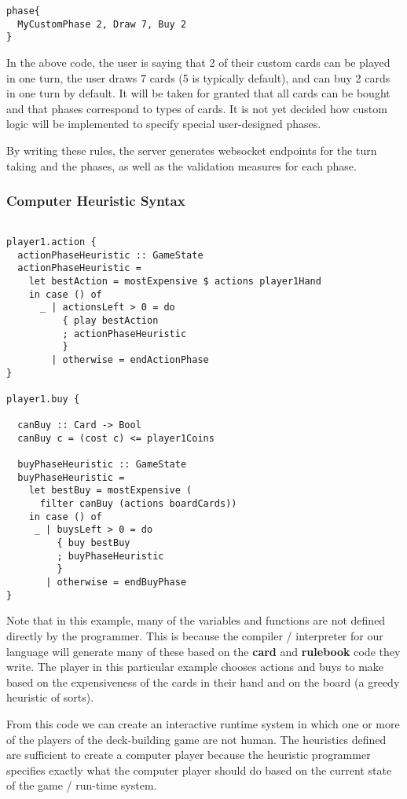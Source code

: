 \documentclass{acm_proc_article-sp}
\begin{document}
\begin{verbatim}
phase{
  MyCustomPhase 2, Draw 7, Buy 2
}
\end{verbatim}
In the above code, the user is saying that 2 of their custom cards can be played in one turn, the user draws 7 cards (5 is typically default), and can buy 2 cards in one turn by default. It will be taken for granted that all cards can be bought and that phases correspond to types of cards. It is not yet decided how custom logic will be implemented to specify special user-designed phases.

By writing these rules, the server generates websocket endpoints for the turn taking and the phases, as well as the validation measures for each phase.

\subsubsection{Computer Heuristic Syntax}
\begin{verbatim}

player1.action {
  actionPhaseHeuristic :: GameState
  actionPhaseHeuristic =
    let bestAction = mostExpensive $ actions player1Hand
    in case () of
      _ | actionsLeft > 0 = do
          { play bestAction
          ; actionPhaseHeuristic
          }
        | otherwise = endActionPhase
}

player1.buy {

  canBuy :: Card -> Bool
  canBuy c = (cost c) <= player1Coins

  buyPhaseHeuristic :: GameState
  buyPhaseHeuristic =
    let bestBuy = mostExpensive (
      filter canBuy (actions boardCards))
    in case () of
     _ | buysLeft > 0 = do
         { buy bestBuy
         ; buyPhaseHeuristic
         }
       | otherwise = endBuyPhase
}

\end{verbatim}

Note that in this example, many of the variables and functions are not defined directly
by the programmer. This is because the compiler / interpreter for our language will generate
many of these based on the {\bf card} and {\bf rulebook} code they write. The player in this
particular example chooses actions and buys to make based on the expensiveness of the cards
in their hand and on the board (a greedy heuristic of sorts).

From this code we can create an interactive runtime system in which one or more of the players
of the deck-building game are not human. The heuristics defined are sufficient to create a
computer player because the heuristic programmer specifies exactly what the computer player
should do based on the current state of the game / run-time system.
\end{document}

